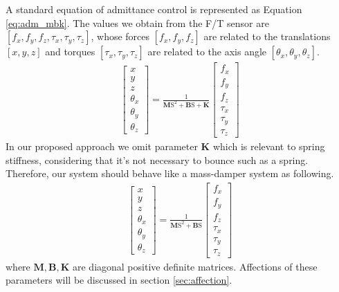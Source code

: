 A standard equation of admittance control is represented as Equation \ref{eq:adm_mbk}. The values we obtain from the F/T sensor are $\left[f_x, f_y, f_z,\tau _x, \tau _y, \tau _z \right]$, whose forces $ \left[f_x, f_y, f_z\right]$ are related to the translations $ \left[x, y, z\right]$ and torques $ \left[\tau _x, \tau _y, \tau _z\right]$ are related to the axis angle $ \left[\theta _x,\theta _y,\theta _z\right]$. 
\begin{equation}
\label{eq:adm_mbk}
\begin{split}
\begin{bmatrix}
x \\
y \\
z \\
\theta _x \\
\theta _y \\
\theta _z 
\end{bmatrix}
=
\frac{1}{\mathbf{M}\mathrm{S}^2+\mathbf{B}\mathrm{S}+\mathbf{K}}
\begin{bmatrix}
f_x \\
f_y \\
f_z \\
\tau _x \\
\tau _y \\
\tau _z 
\end{bmatrix}
\end{split}
\end{equation}
In our proposed approach we omit parameter $\mathbf{K}$ which is relevant to spring stiffness, considering that it's not necessary to bounce such as a spring. Therefore, our system should behave like a mass-damper system as following.
\begin{equation}
\label{eq:adm_mb}
\begin{split}
\begin{bmatrix}
x \\
y \\
z \\
\theta _x \\
\theta _y \\
\theta _z 
\end{bmatrix}
=
\frac{1}{\mathbf{M}\mathrm{S}^2+\mathbf{B}\mathrm{S}}
\begin{bmatrix}
f_x \\
f_y \\
f_z \\
\tau _x \\
\tau _y \\
\tau _z 
\end{bmatrix}
\end{split}
\end{equation}
where $\mathbf{M},\mathbf{B},\mathbf{K}$ are diagonal positive definite matrices. Affections of these parameters will be discussed in section \ref{sec:affection}.

